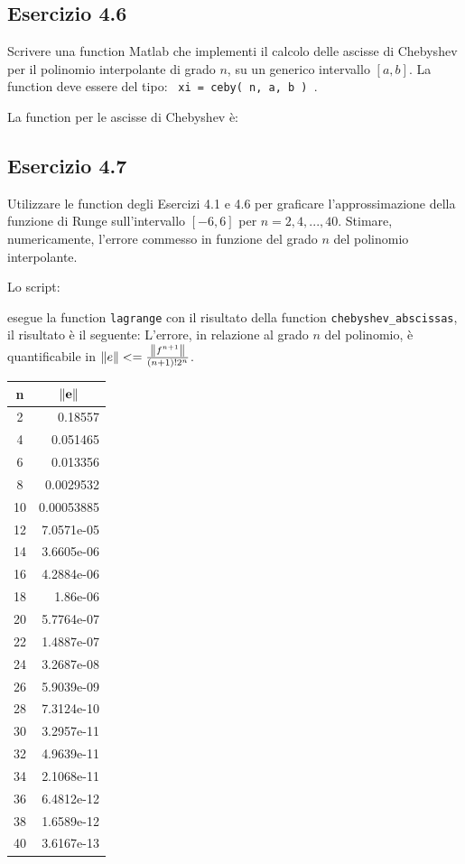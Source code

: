 	\subsection {Esercizio 4.6}
Scrivere una function Matlab che implementi il calcolo delle ascisse di Chebyshev per il polinomio interpolante di grado $n$, su un generico intervallo $[a,b]$. La function deve essere del tipo: \texttt { xi = ceby( n, a, b ) }.

La function per le ascisse di Chebyshev è:




	\subsection {Esercizio 4.7}
Utilizzare le function degli Esercizi 4.1 e 4.6 per graficare l'approssimazione della funzione di Runge sull'intervallo $[-6,6]$ per $n= 2,4, ... ,40$. Stimare, numericamente, l'errore commesso in funzione del grado $n$ del polinomio interpolante.

Lo script:

esegue la function \lstinline{lagrange} con il risultato della function \lstinline{chebyshev_abscissas}, il risultato è il seguente:
L'errore, in relazione al grado $n$ del polinomio, è quantificabile in $\norm{e} <= \frac{\norm{f^{n+1}}}{(n+1)!2^n}$.

\begin{tabular}{ c | r }
\textbf{n} & \multicolumn{1}{c}{$\mathbf{\norm{e}}$} \\
\hline
2  &   0.18557  \\
4  &  0.051465  \\
6  &  0.013356  \\
8  & 0.0029532  \\
10 & 0.00053885 \\
12 & 7.0571e-05 \\
14 & 3.6605e-06 \\
16 & 4.2884e-06 \\
18 &   1.86e-06 \\
20 & 5.7764e-07 \\
22 & 1.4887e-07 \\
24 & 3.2687e-08 \\
26 & 5.9039e-09 \\
28 & 7.3124e-10 \\
30 & 3.2957e-11 \\
32 & 4.9639e-11 \\
34 & 2.1068e-11 \\
36 & 6.4812e-12 \\
38 & 1.6589e-12 \\
40 & 3.6167e-13
\end{tabular}

